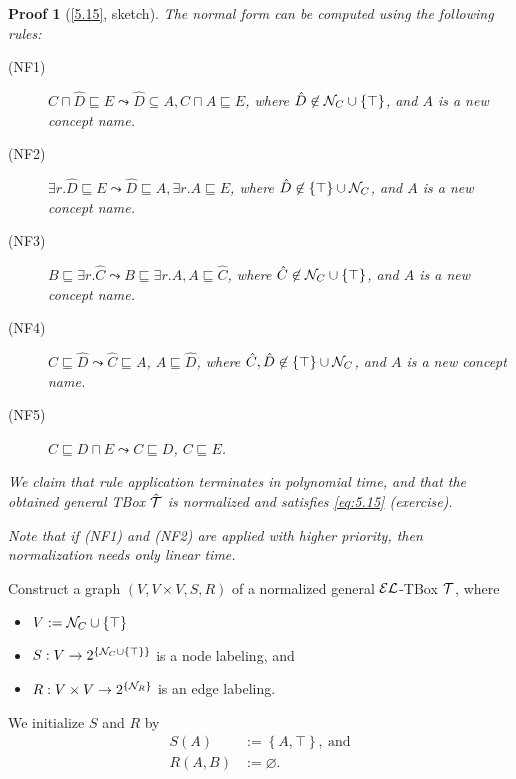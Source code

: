\documentclass[openany]{scrbook}
\theoremstyle{break}
\theoremstyle{nonumberbreak}
\theoremstyle{nonumberplain}
\theoremstyle{nonumberbreak}
\newtheorem{Proof}{Proof}
\newcommand{\set}[1]{\left\{#1\right\}}
\newcommand{\powerset}[1]{2^{\left\{{#1}\right\}}}
\newcommand{\EL}{{\cal E}{\cal L}}
\begin{document}
\begin{Proof}[\cref{5.15}, sketch]
  The normal form can be computed using the following rules:
  \begin{description}
  \item[(NF1)] $C \sqcap \hat{D} \sqsubseteq E \leadsto \hat{D}
    \subseteq A, C \sqcap A \sqsubseteq E$, where $\hat{D} \not\in
    {\cal N}_C \cup \set{\top}$, and $A$ is a new concept name.
  \item[(NF2)] $\exists r.\hat{D} \sqsubseteq E \leadsto \hat{D}
    \sqsubseteq A, \exists r.A \sqsubseteq E$, where $\hat{D} \not\in
    \set{\top} \cup {\cal N}_C$, and $A$ is a new concept name.
  \item[(NF3)] $B \sqsubseteq \exists r.\hat{C} \leadsto B \sqsubseteq
  \exists r.A, A \sqsubseteq \hat{C}$, where $\hat{C} \not\in {\cal
    N}_C \cup \set{\top}$, and $A$ is a new concept name.
\item[(NF4)] $\hat{C} \sqsubseteq \hat{D} \leadsto \hat{C} \sqsubseteq
  A$, $A \sqsubseteq \hat{D}$, where $\hat{C}, \hat{D} \not\in
  \set{\top} \cup {\cal N}_C$, and $A$ is a new concept name.
\item[(NF5)] $C \sqsubseteq D \sqcap E \leadsto C \sqsubseteq D$, $C
  \sqsubseteq E$.
  \end{description}

  We claim that rule application terminates in polynomial time, and
  that the obtained general TBox $\hat{\cal T}$ is normalized and
  satisfies \cref{eq:5.15} (exercise).

  Note that if (NF1) and (NF2) are applied with higher priority, then
  normalization needs only linear time.
\end{Proof}

Construct a graph $(V, V \times V, S, R)$ of a normalized general
$\EL$-TBox ${\cal T}$, where
\begin{itemize}
\item $V := {\cal N}_C \cup \set{\top}$
\item $S: V \to \powerset{{\cal N}_C \cup \set{\top}}$ is a node
  labeling, and
\item $R: V \times V \to \powerset{{\cal N}_R}$ is an edge labeling.
\end{itemize}

We initialize $S$ and $R$ by
\begin{align*}
  S(A) & := \set{A, \top},\ \text{and} \\
  R(A, B) & := \varnothing.
\end{align*}
\end{document}
